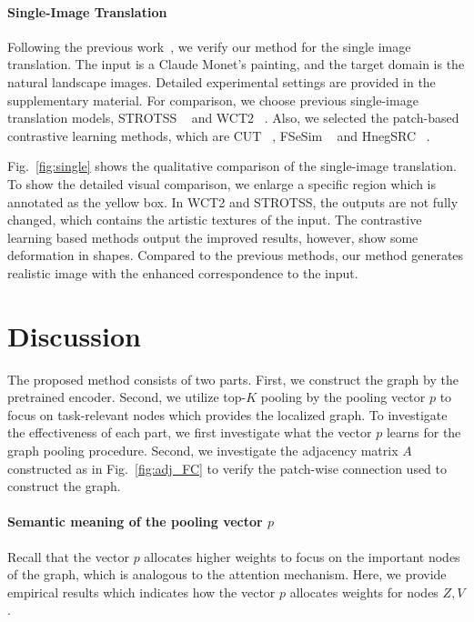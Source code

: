 \documentclass[letterpaper]{article} %
\begin{document}
\paragraph{Single-Image Translation}
Following the previous work~\cite{cut}, we verify our method for the single image translation. The input is a Claude Monet's painting, and the target domain is the natural landscape images.
Detailed experimental settings are provided in the supplementary material.
For comparison, we choose previous single-image translation models, STROTSS ~\cite{strotss} and WCT2 ~\cite{wct2}. Also, we selected the patch-based contrastive learning methods, which are CUT ~\cite{cut}, FSeSim ~\cite{sesim} and HnegSRC ~\cite{HnegSRC}.

Fig.~\ref{fig:single} shows the qualitative comparison of the single-image translation. To show the detailed visual comparison, we enlarge a specific region which is annotated as the yellow box. In WCT2 and STROTSS, the outputs are not fully changed, which contains the artistic textures of the input. The contrastive learning based methods output the improved results, however, show some deformation in shapes.
Compared to the previous methods, our method generates realistic image with the enhanced correspondence to the input.

\section{Discussion}

The proposed method consists of two parts. First, we construct the graph by the pretrained encoder. Second, we utilize top-$K$ pooling by the pooling vector $p$ to focus on task-relevant nodes which provides the localized graph.
To investigate the effectiveness of each part, we first investigate what the vector $p$ learns for the graph pooling procedure.
Second, we investigate the adjacency matrix $A$ constructed as in Fig.~\ref{fig:adj_FC}
to verify the patch-wise connection used to construct the graph.



\paragraph{Semantic meaning of the pooling vector $p$ }
Recall that the vector $p$ allocates higher weights to focus on the important nodes of the graph, which is analogous to the attention mechanism.
Here, we provide empirical results which indicates how the vector $p$ allocates weights for nodes $Z, V$.
\end{document}
